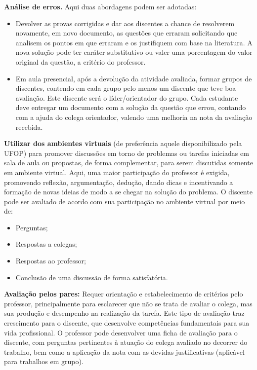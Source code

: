 \documentclass[
	12pt,				%
	openright,			%
	oneside,			%
	a4paper,			%
	english,			%
	brazil				%
	]{abntex2}
\begin{document}
\noindent \textbf{Análise de erros.} Aqui duas abordagens podem ser adotadas:

\begin{itemize}
\item Devolver as provas corrigidas e dar aos discentes a chance de resolverem novamente, em novo documento, as questões que erraram solicitando que analisem os pontos em que erraram e os justifiquem com base na literatura. A nova solução pode ter caráter substitutivo ou valer uma porcentagem do valor original da questão, a critério do professor.

\item Em aula presencial, após a devolução da atividade avaliada, formar grupos de discentes, contendo em cada grupo pelo menos um discente que teve boa avaliação. Este discente será o líder/orientador do grupo. Cada estudante deve entregar um documento com a solução da questão que errou, contando com a ajuda do colega orientador, valendo uma melhoria na nota da avaliação recebida.

\end{itemize}

\noindent \textbf{Utilizar dos ambientes virtuais} (de preferência aquele disponibilizado pela UFOP) para promover discussões em torno de problemas ou tarefas iniciadas em sala de aula ou propostas, de forma complementar, para serem discutidas somente em ambiente virtual. Aqui, uma maior participação do professor é exigida, promovendo reflexão, argumentação, dedução, dando dicas e incentivando a formação de novas ideias de modo a se chegar na solução do problema. O discente pode ser avaliado de acordo com sua participação no ambiente virtual por meio de:
\begin{itemize}
    \item Perguntas;
    \item Respostas a colegas;
    \item Respostas ao professor;
    \item Conclusão de uma discussão de forma satisfatória.
\end{itemize}

\noindent \textbf{Avaliação pelos pares:} Requer orientação e estabelecimento de critérios pelo professor, principalmente para esclarecer que não se trata de avaliar o colega, mas sua produção e desempenho na realização da tarefa. Este tipo de avaliação traz crescimento para o discente, que desenvolve competências fundamentais para sua vida profissional. O professor pode desenvolver uma ficha de avaliação para o discente, com perguntas pertinentes à atuação do colega avaliado no decorrer do trabalho, bem como a aplicação da nota com as devidas justificativas (aplicável para trabalhos em grupo).
\end{document}
